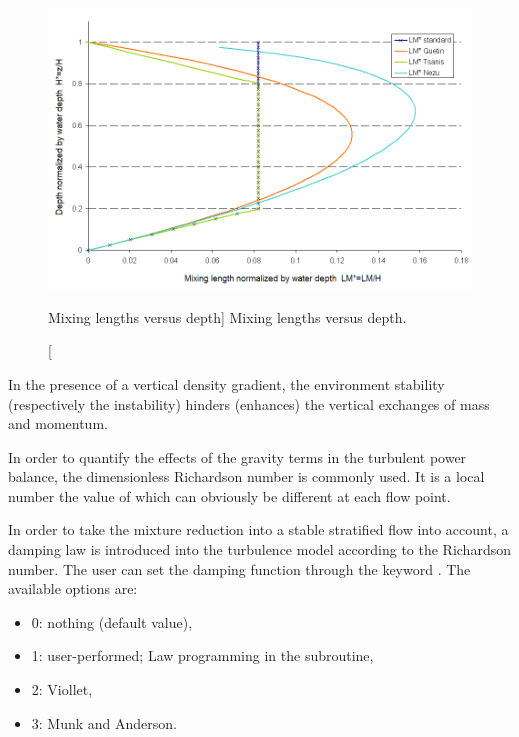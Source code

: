 \begin{figure}[H]%
\begin{center}
%
  \includegraphics[width=\textwidth]{./graphics/mixing_lengths}
%
\end{center}
\caption
[Mixing lengths versus depth]
{Mixing lengths versus depth.}
\label{fig:mix_len}
\end{figure}

In the presence of a vertical density gradient, the environment stability
(respectively the instability) hinders (enhances) the vertical exchanges of
mass and momentum.

In order to quantify the effects of the gravity terms in the turbulent power
balance, the dimensionless Richardson number is commonly used. It is a local
number the value of which can obviously be different at each flow point.

In order to take the mixture reduction into a stable stratified flow into
account, a damping law is introduced into the turbulence model according to the
Richardson number. The user can set the damping function through the keyword
. The available options are:

\begin{itemize}
\item  0: nothing (default value),

\item  1: user-performed; Law programming in the  subroutine,

\item  2: Viollet,

\item  3: Munk and Anderson.
\end{itemize}

